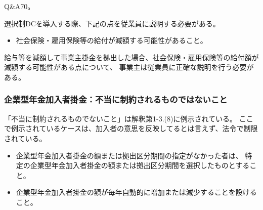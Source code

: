 \begin{itembox}[l]{}
  Q\&A70。

  選択制DCを導入する際、下記の点を従業員に説明する必要がある。

  \begin{itemize}
    \item 社会保険・雇用保険等の給付が減額する可能性があること。
  \end{itemize}
\end{itembox}

\begin{sol}
  \;
  
  給与等を減額して事業主掛金を拠出した場合、社会保険・雇用保険等の給付額が減額する可能性がある点について、
  事業主は従業員に正確な説明を行う必要がある。

\end{sol}

\newpage

\subsubsection{企業型年金加入者掛金：不当に制約されるものではないこと}

\begin{itembox}[l]{}
  「不当に制約されるものでないこと」は解釈第1-3.(8)に例示されている。
  ここで例示されているケースは、加入者の意思を反映してるとは言えず、法令で制限されている。
\end{itembox}

\begin{sol}
  \;
  
  \begin{itemize}
    \item 企業型年金加入者掛金の額または拠出区分期間の指定がなかった者は、
      特定の企業型年金加入者掛金の額または拠出区分期間を選択したものとすること。
    \item 企業型年金加入者掛金の額が毎年自動的に増加または減少することを設けること。
  \end{itemize}
\end{sol}

